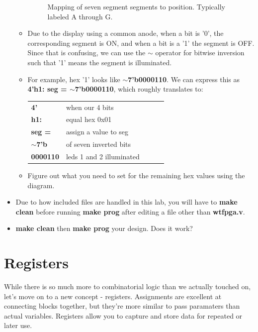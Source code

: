 \documentclass[12pt,a4paper]{article}
\begin{document}
\begin{itemize}
\begin{itemize}
\begin{figure}[H]
\begin{center}
			\caption{Mapping of seven segment segments to position. Typically labeled A through G.}
		\end{center} 
	\end{figure}
		\item Due to the display using a common anode, when a bit is '0', the corresponding segment is ON, and when a bit is a '1' the segment is OFF. Since that is confusing, we can use the $\sim$ operator for bitwise inversion such that '1' means the segment is illuminated. 
		\item For example, hex '1' looks like \textbf{$\sim$7'b0000110}. We can express this as \\ \textbf{4'h1: seg = $\sim$7'b0000110}, which roughly translates to:
		\begin{table}[H]
			\centering
			\begin{tabular}{lllll}
				\textbf{4'}        & when our 4 bits          &  &  &  \\
				\textbf{h1:}       & equal hex 0x01           &  &  &  \\
				\textbf{seg =}   & assign a value to seg    &  &  &  \\
				\textbf{$\sim$7'b} & of seven inverted bits   &  &  &  \\
				\textbf{0000110}   & leds 1 and 2 illuminated &  &  & 
			\end{tabular}
		\end{table}
		\item Figure out what you need to set for the remaining hex values using the diagram. 
	\end{itemize}
	\item Due to how included files are handled in this lab, you will have to \textbf{make clean} before running \textbf{make prog} after editing a file other than \textbf{wtfpga.v}.
	\item \textbf{make clean} then \textbf{make prog} your design. Does it work?
\end{itemize}
\section{Registers}
While there is so much more to combinatorial logic than we actually touched on, let's move on to a new concept - registers. Assignments are excellent at connecting blocks together, but they're more similar to pass paramaters than actual variables. Registers allow you to capture and store data for repeated or later use. \\
\end{document}
